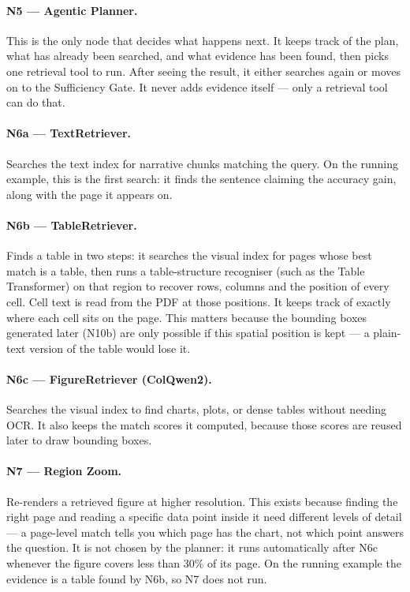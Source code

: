 \paragraph{N5 --- Agentic Planner.}
This is the only node that decides what happens next. It keeps track of the plan,
what has already been searched, and what evidence has been found, then picks one
retrieval tool to run. After seeing the result, it either searches again or moves
on to the Sufficiency Gate. It never adds evidence itself --- only a retrieval tool
can do that.

\paragraph{N6a --- TextRetriever.}
Searches the text index for narrative chunks matching the query. On the running
example, this is the first search: it finds the sentence claiming the accuracy
gain, along with the page it appears on.

\paragraph{N6b --- TableRetriever.}
Finds a table in two steps: it searches the visual index for pages whose best
match is a table, then runs a table-structure recogniser (such as the Table
Transformer) on that region to recover rows, columns and the position of every
cell. Cell text is read from the PDF at those positions. It keeps track of exactly
where each cell sits on the page. This matters because the bounding boxes generated later (N10b) are only
possible if this spatial position is kept --- a plain-text version of the table
would lose it.

\paragraph{N6c --- FigureRetriever (ColQwen2).}
Searches the visual index to find charts, plots, or dense tables without needing
OCR. It also keeps the match scores it computed, because those scores are reused
later to draw bounding boxes.

\paragraph{N7 --- Region Zoom.}
Re-renders a retrieved figure at higher resolution. This exists because finding the
right page and reading a specific data point inside it need different levels of
detail --- a page-level match tells you which page has the chart, not which point
answers the question. It is not chosen by the planner: it runs automatically after
N6c whenever the figure covers less than 30\% of its page. On the running example
the evidence is a table found by N6b, so N7 does not run.

